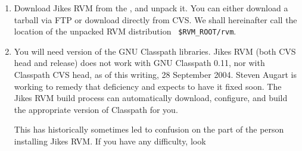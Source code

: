 \begin{enumerate}
We have had mixed experiences with different releases of the Jikes
compiler. Versions 1.13 and 1.18 are known to work for building Jikes
RVM. Versions 1.14 through 1.17, 1.20, and 1.21 are known {\em not}\/ to
work.  Version 1.19 has worked for many people, but we have had
problems reported on OSX. 


\begin{small}
{\tt jikes-1.15} in
particular --- installed by default with SuSE Linux 8.1 --- has a
byte-code generation bug that will cause Jikes RVM to crash with an
{\tt ArrayIndexOutOfBounds} exception.  Jikes 1.21 dumps core with an assertion failure when it
builds Jikes RVM.

{\tt jikes-1.13}, as of the last
time we tried it (September 28, 2004) works fine, and sometimes generates
better error messages than {\tt jikes-1.18}.
\end{small}

\item Download Jikes RVM from the , and unpack it.   You can either
  download a tarball via FTP or download directly from CVS.  We shall
hereinafter call the location of the unpacked RVM distribution {\tt
  \$RVM\_\-ROOT\-/\-rvm}.   


%
%
\item You will need version \classpathversion{} of the GNU
Classpath libraries.  
Jikes RVM (both CVS head and release) does not work with GNU Classpath
0.11, nor with Classpath CVS head, as of this writing, 28 September
2004.  Steven Augart is working to remedy that deficiency and expects
to have it fixed soon. 
The Jikes RVM build process can automatically download, 
configure, and build the appropriate version of Classpath for you.

This has historically sometimes led to confusion on the part of the
person installing Jikes RVM.\@  
If you have any difficulty, look \AtManualClasspathRootDiscussion{}


\end{enumerate}
